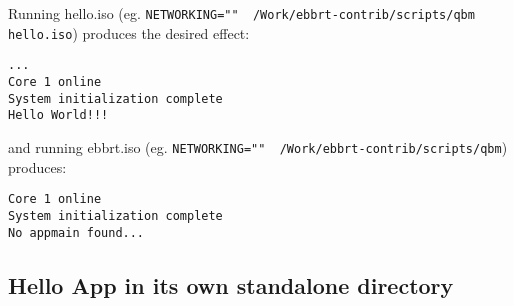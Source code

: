\documentclass[11pt]{report}
\begin{document}
Running hello.iso (eg. {\tt NETWORKING="" ~/Work/ebbrt-contrib/scripts/qbm hello.iso}) produces the desired effect:
\begin{verbatim}
...
Core 1 online
System initialization complete
Hello World!!!
\end{verbatim}

and running ebbrt.iso (eg. {\tt NETWORKING="" ~/Work/ebbrt-contrib/scripts/qbm})
produces:
\begin{verbatim}
Core 1 online
System initialization complete
No appmain found...
\end{verbatim}

\subsection{Hello App in its own standalone directory}
\end{document}
